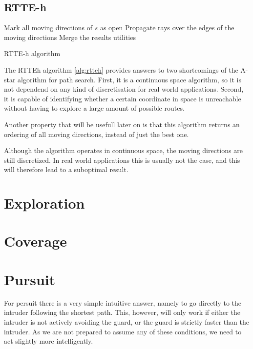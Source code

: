 \documentclass{report}
\begin{document}
		\subsection{RTTE-h}

			\begin{algorithm}[H]
				Mark all moving directions of $s$ as open\;
				Propagate rays over the edges of the moving directions\;
				Merge the results\;
				\Return utilities\;
				\label{alg:rtteh}
				\caption{RTTE-h algorithm~\protect\cite{undeger2010multi}}
			\end{algorithm}

			The RTTEh algorithm \ref{alg:rtteh} provides answers to two shortcomings of the A-star algorithm for path search. First, it is a continuous space algorithm, so it is not dependend on any kind of discretisation for real world applications. Second, it is capable of identifying whether a certain coordinate in space is unreachable without having to explore a large amount of possible routes.

			Another property that will be usefull later on is that this algorithm returns an ordering of all moving directions, instead of just the best one.

			Although the algorithm operates in continuous space, the moving directions are still discretized. In real world applications this is usually not the case, and this will therefore lead to a suboptimal result.


		

	\section{Exploration}

	\section{Coverage}

	\section{Pursuit}
		For persuit there is a very simple intuitive answer, namely to go directly to the intruder following the shortest path. This, however, will only work if either the intruder is not actively avoiding the guard, or the guard is strictly faster than the intruder. As we are not prepared to assume any of these conditions, we need to act slightly more intelligently.
\end{document}
